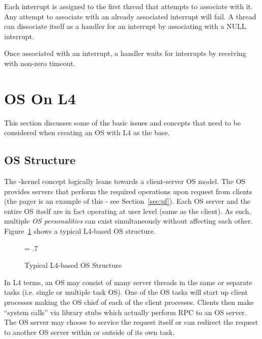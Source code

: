 Each interrupt is assigned to the first thread that attempts to
associate with it. Any attempt to associate with an already associated
interrupt will fail. A thread can dissociate itself as a handler for
an interrupt by associating with a NULL interrupt.

Once associated with an interrupt, a handler waits for interrupts by
receiving with non-zero timeout.


\section{OS On L4}


This section discusses some of the basic issues and concepts that need
to be considered when creating an OS with L4 as the base.


\subsection{\label{s:u:osstruct}OS Structure}


The \micro-kernel concept logically leans towards a client-server OS
model. The OS provides servers that perform the required operations
upon request from clients (the pager is an example of this - see
Section~\ref{sec:pf}). Each OS server and the entire OS itself are in
fact operating at user level (same as the client). As such, multiple
\emph{OS personalities} can exist simultaneously without affecting
each other. Figure~\ref{fig:l4-os} shows a typical L4-based OS
structure.\\ 

\begin{figure}[h]
\begin{center}
\leavevmode
\epsfxsize = .7\textwidth
{}
\end{center}
\caption{Typical L4-based OS Structure}
\label{fig:l4-os}
\end{figure}

In L4 terms, an OS may consist of many server threads in the same or
separate tasks (i.e. single or multiple task OS). One of the OS tasks
will start up client processes making the OS chief of each of the
client processes.  Clients then make ``system calls'' via library
stubs which actually perform RPC to an OS server. The OS server may
choose to service the request itself or can redirect the request to
another OS server within or outside of its own task.

